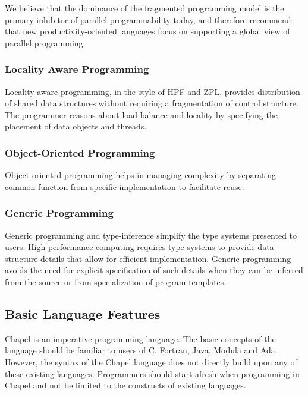 We believe that the dominance of the fragmented programming model is the primary
inhibitor of parallel programmability today, and therefore recommend that new
productivity-oriented languages focus on supporting a global view of parallel
programming.  





\subsubsection{Locality Aware Programming}
\label{Locality_Aware_Programming}

Locality-aware programming, in the style of HPF and
ZPL, provides distribution of shared data structures without
requiring a fragmentation of control structure. The programmer
reasons about load-balance and locality by specifying
the placement of data objects and threads.

\subsubsection{Object-Oriented Programming}
\label{Object-Oriented_Programming}

Object-oriented programming helps in managing complexity
by separating common function from specific implementation
to facilitate reuse.

\subsubsection{Generic Programming}
\label{Generic_Programming}

Generic programming and type-inference simplify the
type systems presented to users. High-performance computing
requires type systems to provide data structure details
that allow for efficient implementation. Generic programming
avoids the need for explicit specification of such
details when they can be inferred from the source or from
specialization of program templates.

\subsection{Basic Language Features}
\label{Basic_Language_Features}

Chapel is an imperative programming language.  The basic concepts of the
language should be familiar to users of C, Fortran, Java, Modula and Ada.
However, the syntax of the Chapel language does not directly build upon any of 
these existing languages.   Programmers should start afresh when programming in 
Chapel and not be limited to the constructs of existing languages.


